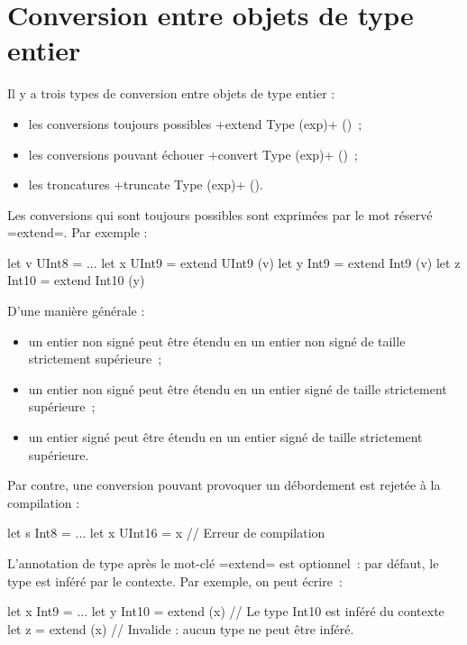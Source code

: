 \section{Conversion entre objets de type entier}

Il y a trois types de conversion entre objets de type entier :
\begin{itemize}
  \item les conversions toujours possibles \omnibus+extend Type (exp)+ ()~;
  \item les conversions pouvant échouer \omnibus+convert Type (exp)+ ()~;
  \item les troncatures \omnibus+truncate Type (exp)+  ().
\end{itemize}



Les conversions qui sont toujours possibles sont exprimées par le mot réservé \omnibus=extend=. Par exemple :
\begin{OMNIBUS}
let v UInt8 = ...
let x UInt9 = extend UInt9 (v)
let y Int9 =  extend Int9 (v)
let z Int10 = extend Int10 (y)
\end{OMNIBUS}

D'une manière générale :
\begin{itemize}
\item un entier non signé peut être étendu en un entier non signé de taille strictement supérieure~;
\item un entier non signé peut être étendu en un entier signé de taille strictement supérieure~;
\item un entier signé peut être étendu en un entier signé de taille strictement supérieure.
\end{itemize}

Par contre, une conversion pouvant provoquer un débordement est rejetée à la compilation :
\begin{OMNIBUS}
let s Int8 = ...
let x UInt16 = x // Erreur de compilation
\end{OMNIBUS}

L'annotation de type après le mot-clé \omnibus=extend= est optionnel~: par défaut, le type est inféré par le contexte. Par exemple, on peut écrire~:
\begin{OMNIBUS}
let x Int9 =  ...
let y Int10 = extend (x) // Le type Int10 est inféré du contexte
let z = extend (x) // Invalide : aucun type ne peut être inféré.
\end{OMNIBUS}


